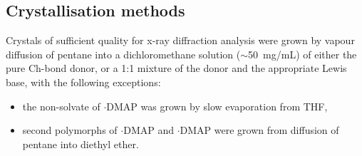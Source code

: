 \normalsize

\subsection{Crystallisation methods}
Crystals of sufficient quality for x-ray diffraction analysis were grown by vapour diffusion of pentane into a dichloromethane solution ($\sim$50~mg/mL) of either the pure Ch-bond donor, or a 1:1 mixture of the donor and the appropriate Lewis base, with the following exceptions:
\begin{itemize}
    \item the non-solvate of $\cdot$DMAP was grown by slow evaporation from THF,
    \item second polymorphs of $\cdot$DMAP and $\cdot$DMAP were grown from diffusion of pentane into diethyl ether.
\end{itemize}
